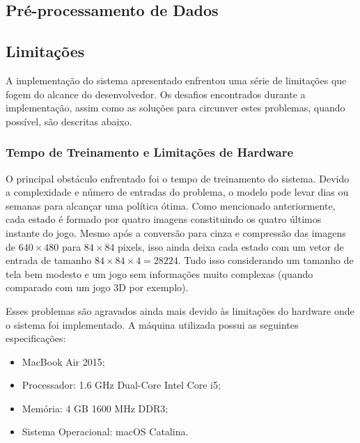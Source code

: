 \subsection{Pré-processamento de Dados} %
\label{sub:preprocessamento}



\subsection{Limitações} %
\label{sub:limitacoes}

A implementação do sistema apresentado enfrentou uma série de limitações que fogem do alcance do desenvolvedor. Os desafios encontrados durante a implementação, assim como as soluções para circunver estes problemas, quando possível, são descritas abaixo.

\subsubsection{Tempo de Treinamento e Limitações de Hardware} %
\label{subsub:tempo_de_treinamento_e_limitações_de_hardware}

O principal obstáculo enfrentado foi o tempo de treinamento do sistema. Devido a complexidade e número de entradas do problema, o modelo pode levar dias ou semanas para alcançar uma política ótima. Como mencionado anteriormente, cada estado é formado por quatro imagens constituindo os quatro últimos instante do jogo. Mesmo após a conversão para cinza e compressão das imagens de $640\times480$ para $84\times84$ pixels, isso ainda deixa cada estado com um vetor de entrada de tamanho $84\times84\times4=28224$. Tudo isso considerando um tamanho de tela bem modesto e um jogo sem informações muito complexas (quando comparado com um jogo 3D por exemplo).

Esses problemas são agravados ainda mais devido às limitações do hardware onde o sistema foi implementado. A máquina utilizada possui as seguintes especificações:

\begin{itemize}
  \item MacBook Air 2015;
  \item Processador: 1.6 GHz Dual-Core Intel Core i5;
  \item Memória: 4 GB 1600 MHz DDR3;
  \item Sistema Operacional: macOS Catalina.
\end{itemize}

